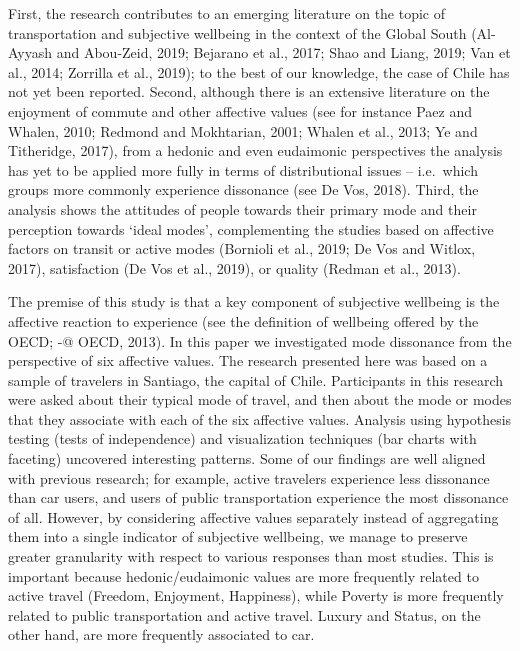 \documentclass[]{elsarticle} %
\begin{document}
First, the research contributes to an emerging literature on the topic
of transportation and subjective wellbeing in the context of the Global
South (Al-Ayyash and Abou-Zeid, 2019; Bejarano et al., 2017; Shao and
Liang, 2019; Van et al., 2014; Zorrilla et al., 2019); to the best of
our knowledge, the case of Chile has not yet been reported. Second,
although there is an extensive literature on the enjoyment of commute
and other affective values (see for instance Paez and Whalen, 2010;
Redmond and Mokhtarian, 2001; Whalen et al., 2013; Ye and Titheridge,
2017), from a hedonic and even eudaimonic perspectives the analysis has
yet to be applied more fully in terms of distributional issues --
i.e.~which groups more commonly experience dissonance (see De Vos,
2018). Third, the analysis shows the attitudes of people towards their
primary mode and their perception towards `ideal modes', complementing
the studies based on affective factors on transit or active modes
(Bornioli et al., 2019; De Vos and Witlox, 2017), satisfaction (De Vos
et al., 2019), or quality (Redman et al., 2013).

The premise of this study is that a key component of subjective
wellbeing is the affective reaction to experience (see the definition of
wellbeing offered by the OECD; -@ OECD, 2013). In this paper we
investigated mode dissonance from the perspective of six affective
values. The research presented here was based on a sample of travelers
in Santiago, the capital of Chile. Participants in this research were
asked about their typical mode of travel, and then about the mode or
modes that they associate with each of the six affective values.
Analysis using hypothesis testing (tests of independence) and
visualization techniques (bar charts with faceting) uncovered
interesting patterns. Some of our findings are well aligned with
previous research; for example, active travelers experience less
dissonance than car users, and users of public transportation experience
the most dissonance of all. However, by considering affective values
separately instead of aggregating them into a single indicator of
subjective wellbeing, we manage to preserve greater granularity with
respect to various responses than most studies. This is important
because hedonic/eudaimonic values are more frequently related to active
travel (Freedom, Enjoyment, Happiness), while Poverty is more frequently
related to public transportation and active travel. Luxury and Status,
on the other hand, are more frequently associated to car.
\end{document}
